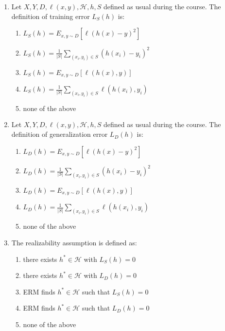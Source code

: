 \documentclass[a4paper,11pt,oneside]{book}
\begin{document}
\begin{enumerate}
    \item Let $X, Y, D, \ell(x, y), \mathcal{H}, h, S$ defined as usual during the course. The definition of training error $L_S(h)$ is:
    \begin{enumerate}[label=\alph*)]
        \item $L_S(h) = E_{x,y \sim D}[\ell(h(x) - y)^2]$
        \item $L_S(h) = \frac{1}{|S|} \sum_{(x_i, y_i) \in S} (h(x_i) - y_i)^2$
        \item $L_S(h) = E_{x,y \sim D}[\ell(h(x), y)]$
        \item $L_S(h) = \frac{1}{|S|} \sum_{(x_i, y_i) \in S} \ell(h(x_i), y_i)$
        \item none of the above
    \end{enumerate}

    \item Let $X, Y, D, \ell(x, y), \mathcal{H}, h, S$ defined as usual during the course. The definition of generalization error $L_D(h)$ is:
    \begin{enumerate}[label=\alph*)]
        \item $L_D(h) = E_{x,y \sim D}[\ell(h(x) - y)^2]$
        \item $L_D(h) = \frac{1}{|S|} \sum_{(x_i, y_i) \in S} (h(x_i) - y_i)^2$
        \item $L_D(h) = E_{x,y \sim D}[\ell(h(x), y)]$
        \item $L_D(h) = \frac{1}{|S|} \sum_{(x_i, y_i) \in S} \ell(h(x_i), y_i)$
        \item none of the above
    \end{enumerate}

    \item The realizability assumption is defined as:
    \begin{enumerate}[label=\alph*)]
        \item there exists $h^* \in \mathcal{H}$ with $L_S(h) = 0$
        \item there exists $h^* \in \mathcal{H}$ with $L_D(h) = 0$
        \item ERM finds $h^* \in \mathcal{H}$ such that $L_S(h) = 0$
        \item ERM finds $h^* \in \mathcal{H}$ such that $L_D(h) = 0$
        \item none of the above
    \end{enumerate}

\end{enumerate}
\end{document}
